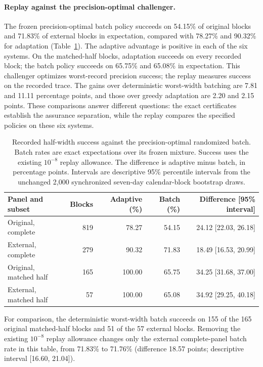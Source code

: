 \paragraph{Replay against the precision-optimal challenger.}
The frozen precision-optimal batch policy succeeds on 54.15\% of original
blocks and 71.83\% of external blocks in expectation, compared with
78.27\% and 90.32\% for adaptation (Table~\ref{tab:complete-precision-replay}).
The adaptive advantage is positive in each of the six systems.
On the matched-half blocks, adaptation succeeds on every recorded block;
the batch policy succeeds on 65.75\% and 65.08\% in expectation.
This challenger optimizes worst-record precision success; the replay
measures success on the recorded trace. The gains over deterministic
worst-width batching are 7.81 and 11.11 percentage points, and those over
greedy adaptation are 2.20 and 2.15 points. These comparisons answer
different questions: the exact certificates establish the assurance
separation, while the replay compares the specified policies on these six
systems.

\begin{table}[htbp]\centering\small
\caption{Recorded half-width success against the precision-optimal randomized
batch. Batch rates are exact expectations over its frozen mixture.
Success uses the existing $10^{-8}$ replay allowance.
The difference is adaptive minus batch, in percentage points.
Intervals are descriptive 95\% percentile intervals from the unchanged
2,000 synchronized seven-day calendar-block bootstrap draws.}
\label{tab:complete-precision-replay}
\begin{tabular}{lrrrr}\toprule
Panel and subset & Blocks & Adaptive (\%) & Batch (\%) & Difference [95\% interval]\\\midrule
Original, complete & 819 & 78.27 & 54.15 & 24.12 [22.03, 26.18]\\
External, complete & 279 & 90.32 & 71.83 & 18.49 [16.53, 20.99]\\
Original, matched half & 165 & 100.00 & 65.75 & 34.25 [31.68, 37.00]\\
External, matched half & 57 & 100.00 & 65.08 & 34.92 [29.25, 40.18]\\\bottomrule
\end{tabular}\end{table}

For comparison, the deterministic worst-width batch succeeds on 155 of
the 165 original matched-half blocks and 51 of the 57 external blocks.
Removing the existing $10^{-8}$ replay allowance changes only the external
complete-panel batch rate in this table, from 71.83\% to 71.76\%
(difference 18.57 points; descriptive interval [16.60, 21.04]).

